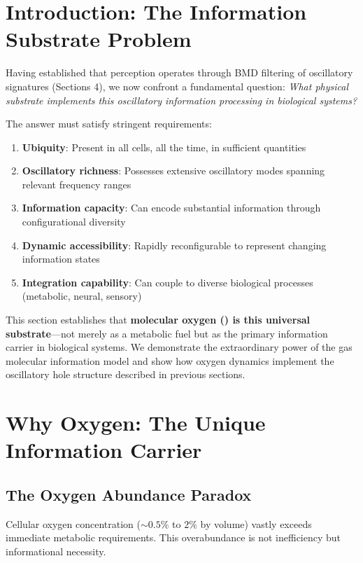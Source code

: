 \section{Introduction: The Information Substrate Problem}

Having established that perception operates through BMD filtering of oscillatory signatures (Sections 4), we now confront a fundamental question: \textit{What physical substrate implements this oscillatory information processing in biological systems?}

The answer must satisfy stringent requirements:
\begin{enumerate}
\item \textbf{Ubiquity}: Present in all cells, all the time, in sufficient quantities
\item \textbf{Oscillatory richness}: Possesses extensive oscillatory modes spanning relevant frequency ranges
\item \textbf{Information capacity}: Can encode substantial information through configurational diversity
\item \textbf{Dynamic accessibility}: Rapidly reconfigurable to represent changing information states
\item \textbf{Integration capability}: Can couple to diverse biological processes (metabolic, neural, sensory)
\end{enumerate}

This section establishes that \textbf{molecular oxygen () is this universal substrate}—not merely as a metabolic fuel but as the primary information carrier in biological systems. We demonstrate the extraordinary power of the gas molecular information model and show how oxygen dynamics implement the oscillatory hole structure described in previous sections.

\section{Why Oxygen: The Unique Information Carrier}

\subsection{The Oxygen Abundance Paradox}

\begin{theorem}
\label{thm:oxygen_overabundance}
Cellular oxygen concentration ($\sim 0.5\%$ to $2\%$ by volume) vastly exceeds immediate metabolic requirements. This overabundance is not inefficiency but informational necessity.
\end{theorem}

